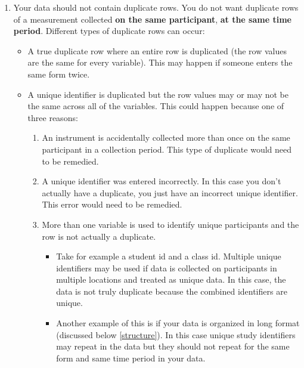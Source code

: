 \documentclass[
]{book}
\providecommand{\tightlist}{%
  \setlength{\itemsep}{0pt}\setlength{\parskip}{0pt}}
\begin{document}
\begin{enumerate}
\def\labelenumi{\arabic{enumi}.}
\setcounter{enumi}{4}
\tightlist
\item
  Your data should not contain duplicate rows. You do not want duplicate rows of a measurement collected \textbf{on the same participant}, \textbf{at the same time period}. Different types of duplicate rows can occur:

  \begin{itemize}
  \tightlist
  \item
    A true duplicate row where an entire row is duplicated (the row values are the same for every variable). This may happen if someone enters the same form twice.
  \item
    A unique identifier is duplicated but the row values may or may not be the same across all of the variables. This could happen because one of three reasons:

    \begin{enumerate}
    \def\labelenumii{\arabic{enumii}.}
    \tightlist
    \item
      An instrument is accidentally collected more than once on the same participant in a collection period. This type of duplicate would need to be remedied.
    \item
      A unique identifier was entered incorrectly. In this case you don't actually have a duplicate, you just have an incorrect unique identifier. This error would need to be remedied.
    \item
      More than one variable is used to identify unique participants and the row is not actually a duplicate.

      \begin{itemize}
      \tightlist
      \item
        Take for example a student id and a class id. Multiple unique identifiers may be used if data is collected on participants in multiple locations and treated as unique data. In this case, the data is not truly duplicate because the combined identifiers are unique.
      \item
        Another example of this is if your data is organized in long format (discussed below \ref{structure}). In this case unique study identifiers may repeat in the data but they should not repeat for the same form and same time period in your data.
      \end{itemize}
    \end{enumerate}
  \end{itemize}
\end{enumerate}
\end{document}
